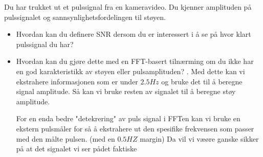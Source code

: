 Du har trukket ut et pulssignal fra en kameravideo. Du kjenner amplituden på pulssignalet og
sannsynlighetsfordelingen til støyen.

\begin{itemize}
  \item Hvordan kan du deﬁnere SNR dersom du er interessert i å se på hvor klart pulssignal du har?
  
  \item Hvordan kan du gjøre dette med en FFT-basert tilnærming om du ikke har en god karakteristikk av støyen eller pulsamplituden?
  . Med dette kan vi ekstrahere informasjonen som er under $2.5Hz$ og bruke det til å beregne signal amplitude. Så kan vi bruke resten av signalet til å beregne støy amplitude. 

For en enda bedre "detekrering" av puls signal i FFTen kan vi bruke en ekstern pulsmåler for så å ekstrahere ut den spesifike frekvensen som passer med den målte pulsen. (med en $0.5 HZ$ margin) Da vil vi væøre ganske sikker på at det signalet vi ser pådet faktiske 
\end{itemize}